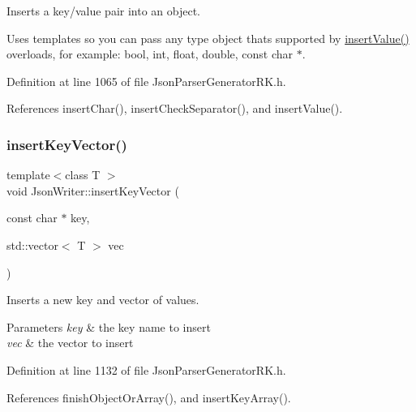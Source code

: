 Inserts a key/value pair into an object. 

Uses templates so you can pass any type object that\textquotesingle{}s supported by \hyperlink{class_json_writer_ac58734c238ba7be066838591b0cc7743}{insert\+Value()} overloads, for example\+: bool, int, float, double, const char $\ast$. 

Definition at line 1065 of file Json\+Parser\+Generator\+R\+K.\+h.



References insert\+Char(), insert\+Check\+Separator(), and insert\+Value().

\mbox{\label{class_json_writer_a14774145a0fa9b1328c1797f76316d82}} 
\subsubsection{\texorpdfstring{insert\+Key\+Vector()}{insertKeyVector()}}
{\footnotesize\ttfamily template$<$class T $>$ \\
void Json\+Writer\+::insert\+Key\+Vector (\begin{DoxyParamCaption}\item[{const char $\ast$}]{key,  }\item[{std\+::vector$<$ T $>$}]{vec }\end{DoxyParamCaption})\hspace{0.3cm}{\ttfamily [inline]}}



Inserts a new key and vector of values. 


\begin{DoxyParams}{Parameters}
{\em key} & the key name to insert\\
\hline
{\em vec} & the vector to insert \\
\hline
\end{DoxyParams}


Definition at line 1132 of file Json\+Parser\+Generator\+R\+K.\+h.



References finish\+Object\+Or\+Array(), and insert\+Key\+Array().

\mbox{\label{class_json_writer_a8a584941a871018cd09315276b8bf7ca}} 
